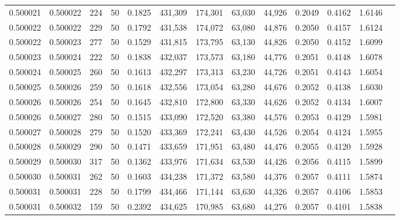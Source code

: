 \begin{tabular}{rrrrrrrrrrrrr}
0.500021 & 0.500022 & 224 &  50 &                                     0.1825 & 431,309 & 174,301 &  63,030 &  44,926 & 0.2049 & 0.4162 & 1.6146 \\
0.500022 & 0.500022 & 229 &  50 &                                     0.1792 & 431,538 & 174,072 &  63,080 &  44,876 & 0.2050 & 0.4157 & 1.6124 \\
0.500022 & 0.500023 & 277 &  50 &                                     0.1529 & 431,815 & 173,795 &  63,130 &  44,826 & 0.2050 & 0.4152 & 1.6099 \\
0.500023 & 0.500024 & 222 &  50 &                                     0.1838 & 432,037 & 173,573 &  63,180 &  44,776 & 0.2051 & 0.4148 & 1.6078 \\
0.500024 & 0.500025 & 260 &  50 &                                     0.1613 & 432,297 & 173,313 &  63,230 &  44,726 & 0.2051 & 0.4143 & 1.6054 \\
0.500025 & 0.500026 & 259 &  50 &                                     0.1618 & 432,556 & 173,054 &  63,280 &  44,676 & 0.2052 & 0.4138 & 1.6030 \\
0.500026 & 0.500026 & 254 &  50 &                                     0.1645 & 432,810 & 172,800 &  63,330 &  44,626 & 0.2052 & 0.4134 & 1.6007 \\
0.500026 & 0.500027 & 280 &  50 &                                     0.1515 & 433,090 & 172,520 &  63,380 &  44,576 & 0.2053 & 0.4129 & 1.5981 \\
0.500027 & 0.500028 & 279 &  50 &                                     0.1520 & 433,369 & 172,241 &  63,430 &  44,526 & 0.2054 & 0.4124 & 1.5955 \\
0.500028 & 0.500029 & 290 &  50 &                                     0.1471 & 433,659 & 171,951 &  63,480 &  44,476 & 0.2055 & 0.4120 & 1.5928 \\
0.500029 & 0.500030 & 317 &  50 &                                     0.1362 & 433,976 & 171,634 &  63,530 &  44,426 & 0.2056 & 0.4115 & 1.5899 \\
0.500030 & 0.500031 & 262 &  50 &                                     0.1603 & 434,238 & 171,372 &  63,580 &  44,376 & 0.2057 & 0.4111 & 1.5874 \\
0.500031 & 0.500031 & 228 &  50 &                                     0.1799 & 434,466 & 171,144 &  63,630 &  44,326 & 0.2057 & 0.4106 & 1.5853 \\
0.500031 & 0.500032 & 159 &  50 &                                     0.2392 & 434,625 & 170,985 &  63,680 &  44,276 & 0.2057 & 0.4101 & 1.5838 \\

\end{tabular}
